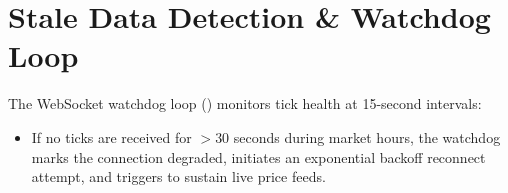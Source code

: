 \section{Stale Data Detection \& Watchdog Loop}
The WebSocket watchdog loop () monitors tick health at 15-second intervals:
\begin{itemize}[leftmargin=6mm,itemsep=1.5mm]
    \item If no ticks are received for $>30$ seconds during market hours, the watchdog marks the connection degraded, initiates an exponential backoff reconnect attempt, and triggers  to sustain live price feeds.
\end{itemize}
